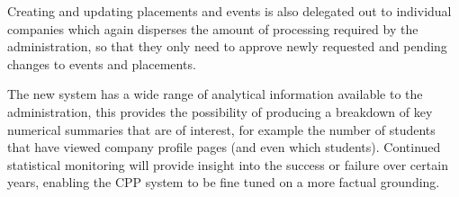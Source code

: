  Creating and updating placements and events is also delegated out to individual companies which again disperses the amount of processing required by the administration, so that they only need to approve newly requested and pending changes to events and placements.

  The new system has a wide range of analytical information available to the administration, this provides the possibility of producing a breakdown of key numerical summaries that are of interest, for example the number of students that have viewed company profile pages (and even which students). Continued statistical monitoring will provide insight into the success or failure over certain years, enabling the CPP system to be fine tuned on a more factual grounding. 